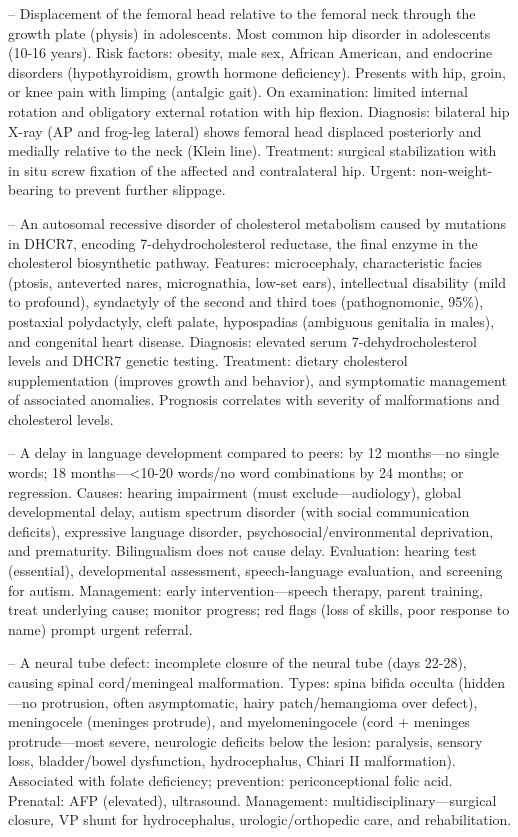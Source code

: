 -- Displacement of the femoral head relative to the femoral neck through the growth plate (physis) in adolescents. Most common hip disorder in adolescents (10-16 years). Risk factors: obesity, male sex, African American, and endocrine disorders (hypothyroidism, growth hormone deficiency). Presents with hip, groin, or knee pain with limping (antalgic gait). On examination: limited internal rotation and obligatory external rotation with hip flexion. Diagnosis: bilateral hip X-ray (AP and frog-leg lateral) shows femoral head displaced posteriorly and medially relative to the neck (Klein line). Treatment: surgical stabilization with in situ screw fixation of the affected and contralateral hip. Urgent: non-weight-bearing to prevent further slippage.

-- An autosomal recessive disorder of cholesterol metabolism caused by mutations in DHCR7, encoding 7-dehydrocholesterol reductase, the final enzyme in the cholesterol biosynthetic pathway. Features: microcephaly, characteristic facies (ptosis, anteverted nares, micrognathia, low-set ears), intellectual disability (mild to profound), syndactyly of the second and third toes (pathognomonic, 95\%), postaxial polydactyly, cleft palate, hypospadias (ambiguous genitalia in males), and congenital heart disease. Diagnosis: elevated serum 7-dehydrocholesterol levels and DHCR7 genetic testing. Treatment: dietary cholesterol supplementation (improves growth and behavior), and symptomatic management of associated anomalies. Prognosis correlates with severity of malformations and cholesterol levels.

-- A delay in language development compared to peers: by 12 months—no single words; 18 months—<10-20 words/no word combinations by 24 months; or regression. Causes: hearing impairment (must exclude—audiology), global developmental delay, autism spectrum disorder (with social communication deficits), expressive language disorder, psychosocial/environmental deprivation, and prematurity. Bilingualism does not cause delay. Evaluation: hearing test (essential), developmental assessment, speech-language evaluation, and screening for autism. Management: early intervention—speech therapy, parent training, treat underlying cause; monitor progress; red flags (loss of skills, poor response to name) prompt urgent referral.

-- A neural tube defect: incomplete closure of the neural tube (days 22-28), causing spinal cord/meningeal malformation. Types: spina bifida occulta (hidden—no protrusion, often asymptomatic, hairy patch/hemangioma over defect), meningocele (meninges protrude), and myelomeningocele (cord + meninges protrude—most severe, neurologic deficits below the lesion: paralysis, sensory loss, bladder/bowel dysfunction, hydrocephalus, Chiari II malformation). Associated with folate deficiency; prevention: periconceptional folic acid. Prenatal: AFP (elevated), ultrasound. Management: multidisciplinary—surgical closure, VP shunt for hydrocephalus, urologic/orthopedic care, and rehabilitation.

